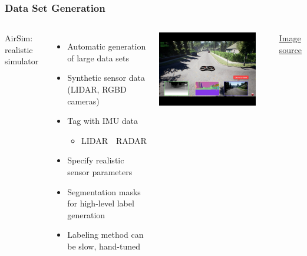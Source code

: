 \documentclass[aspectratio=169]{rubeamer}
\newif\ifpause
\newcommand{\mypause}{\ifpause \pause \fi}
\begin{document}
\begin{frame}
  \frametitle{Data Set Generation}
  \begin{columns}
      AirSim: realistic simulator
      \begin{itemize}
        \item Automatic generation of large data sets
        \mypause
        \item Synthetic sensor data (LIDAR, RGBD cameras)
        \mypause
        \item Tag with IMU data
        \mypause
        \begin{itemize}
          \item LIDAR~\textrightarrow~RADAR
        \end{itemize}
        \mypause
        \item Specify realistic sensor parameters
        \mypause
        \item Segmentation masks for high-level label generation
        \mypause
        \item Labeling method can be slow, hand-tuned
      \end{itemize}
      \onslide
      \includegraphics[width=0.9\textwidth]{airsim}

      \href{https://mspoweruser.com/microsoft-launches-aerial-informatics-and-robotics-platform-to-help-developers-build-autonomous-systems/}{\color{blue}Image source}
    \centering
  \end{columns}
\end{frame}
\end{document}

